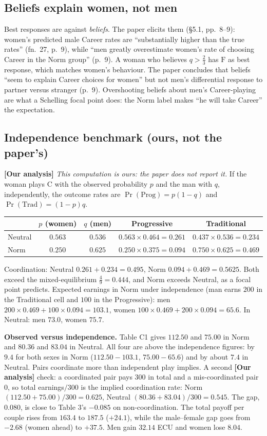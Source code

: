 \documentclass[11pt,a4paper]{article}
\newcommand{\ours}{\textcolor{warn}{\textbf{[Our analysis]}}}
\newcommand{\C}{\mathrm{C}}
\newcommand{\Fm}{\mathrm{F}}
\begin{document}
\subsection{Beliefs explain women, not men}
Best responses are against \emph{beliefs}. The paper elicits them (\S5.1, pp.~8--9): women's
predicted male Career rates are ``substantially higher than the true rates'' (fn.~27, p.~9), while
``men greatly overestimate women's rate of choosing Career in the Norm group'' (p.~9). A woman who
believes $q>\tfrac23$ has $\Fm$ as best response, which matches women's behaviour. The paper
concludes that beliefs ``seem to explain Career choices for women'' but not men's differential
response to partner versus stranger (p.~9). Overshooting beliefs about men's Career-playing are
what a Schelling focal point does: the Norm label makes ``he will take Career'' the expectation.

\subsection{Independence benchmark (ours, not the paper's)}
\ours{} \emph{This computation is ours: the paper does not report it.} If the woman plays $\C$ with
the observed probability $p$ and the man with $q$, independently, the outcome rates are
$\Pr(\text{Prog})=p(1-q)$ and $\Pr(\text{Trad})=(1-p)q$.

\begin{center}
\begin{tabular}{lcccc}
\toprule
 & $p$ (women) & $q$ (men) & Progressive & Traditional \\
\midrule
Neutral & $0.563$ & $0.536$ & $0.563\times0.464=0.261$ & $0.437\times0.536=0.234$ \\
Norm    & $0.250$ & $0.625$ & $0.250\times0.375=0.094$ & $0.750\times0.625=0.469$ \\
\bottomrule
\end{tabular}
\end{center}
Coordination: Neutral $0.261+0.234=0.495$, Norm $0.094+0.469=0.5625$. Both exceed the
mixed-equilibrium $\tfrac49=0.444$, and Norm exceeds Neutral, as a focal point predicts. Expected
earnings in Norm under independence (man earns $200$ in the Traditional cell and $100$ in the
Progressive): men $200\times0.469+100\times0.094=103.1$, women $100\times0.469+200\times0.094=65.6$.
In Neutral: men $73.0$, women $75.7$.

\textbf{Observed versus independence.} Table C1 gives $112.50$ and $75.00$ in Norm and $80.36$ and
$83.04$ in Neutral. All four are above the independence figures: by $9.4$ for both sexes in Norm
($112.50-103.1$, $75.00-65.6$) and by about $7.4$ in Neutral. Pairs coordinate more than
independent play implies. A second \ours{} check:
a coordinated pair pays $300$ in total and a mis-coordinated pair $0$, so total earnings$/300$ is the
implied coordination rate: Norm $(112.50+75.00)/300=0.625$, Neutral $(80.36+83.04)/300=0.545$.
The gap, $0.080$, is close to Table 3's $-0.085$ on non-coordination. The total payoff per couple
rises from $163.4$ to $187.5$ ($+24.1$), while the male--female gap goes from $-2.68$
(women ahead) to $+37.5$. Men gain $32.14$ ECU and women lose $8.04$.
\end{document}
